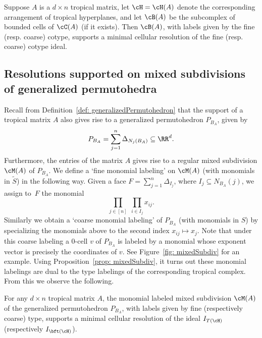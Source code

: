 \begin{prop}\label{prop: cotypeCellRes} Suppose $A$ is a $d \times n$ tropical matrix, let $\cH = \cH(A)$ denote the corresponding arrangement of tropical hyperplanes, and let $\cB(A)$ be the subcomplex of bounded cells of $\cC(A)$ (if it exists). Then $\cB(A)$, with labels given by the fine (resp. coarse) cotype, supports a minimal cellular resolution of the fine (resp. coarse) cotype ideal.
\end{prop}

\subsection{Resolutions supported on mixed subdivisions of generalized permutohedra}

Recall from Definition~\ref{def: generalizedPermutohedron} that the support of a tropical matrix $A$ also gives rise to a generalized permutohedron $P_{B_A}$, given by
\[P_{B_A}= \sum_{j=1}^n \Delta_{N_j(B_A)}\subseteq \RR^d.\]
Furthermore, the entries of the matrix $A$ gives rise to a regular mixed subdivision $\cM(A)$ of $P_{B_A}$.
\noindent
We define a `fine monomial labeling' on $\cM(A)$ (with monomials in $\widetilde{S}$) in the following way. Given a face $F = \sum_{j = 1}^n \Delta_{I_j}$, where $I_j \subseteq N_{B_A}(j)$,  we assign to~$F$ the monomial 
\begin{equation}\label{eqn: fineTypePB}
     \prod_{j \in [n]} \; \prod_{i \in I_j} x_{ij}.
\end{equation}
\noindent
Similarly we obtain a `coarse monomial labeling' of $P_{B_A}$ (with monomials in $S$) by specializing the monomials above to the second index $x_{ij} \mapsto x_j$. 
Note that under this coarse labeling a $0$-cell $v$ of $P_{B_A}$ is labeled by a monomial whose exponent vector is precisely the coordinates of $v$. See Figure~\ref{fig: mixedSubdiv} for an example. Using Proposition~\ref{prop: mixedSubdiv}, it turns out these monomial labelings are dual to the type labelings of the corresponding tropical complex.
From this we observe the following.

\begin{cor}\label{cor: cellResGenPerm}
For any $d \times n$ tropical matrix $A$, the monomial labeled mixed subdivision $\cM(A)$ of the generalized permutohedron $P_{B_A}$, with labels given by fine (respectively coarse) type, supports a minimal cellular resolution of the ideal $I_{T(\cH)}$ (respectively $I_{\bft(\cH)}$). 
\end{cor}


